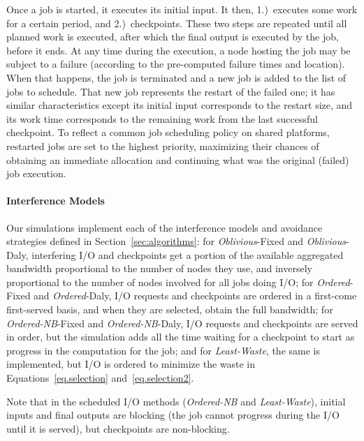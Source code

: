 \documentclass[conference,nofonttune]{IEEEtran}
\newcommand{\nocoop}{\emph{Oblivious}\xspace}
\newcommand{\fifoblock}{\emph{Ordered}\xspace}
\newcommand{\fifononblock}{\emph{Ordered-NB}\xspace}
\newcommand{\leastwaste}{\emph{Least-Waste}\xspace}
\def\propfixed{\nocoop-Fixed\xspace}
\def\propdaly{\nocoop-Daly\xspace}
\def\bfifofixed{\fifoblock-Fixed\xspace}
\def\bfifodaly{\fifoblock-Daly\xspace}
\def\fifofixed{\fifononblock-Fixed\xspace}
\def\fifodaly{\fifononblock-Daly\xspace}
\def\cooperative{\leastwaste}
\begin{document}
Once a job is started, it executes its initial input. It then, 1.)~executes
some work for a certain period, and 2.)~checkpoints. These two steps
are repeated until all planned work is executed, after which the final output
is executed by the job, before it ends.  At any time during the execution, a
node hosting the job may be subject to a failure (according to the pre-computed
failure times and location). When that happens, the job is terminated and a new
job is added to the list of jobs to schedule. That new job represents the
restart of the failed one; it has similar characteristics except its initial
input corresponds to the restart size, and its work time corresponds to the
remaining work from the last successful checkpoint. To reflect a common job
scheduling policy on shared platforms, restarted jobs are set to the highest
priority, maximizing their chances of obtaining an immediate allocation and
continuing what was the original (failed) job execution.


\paragraph*{Interference Models} Our simulations implement each of the
interference models and avoidance strategies defined in
Section~\ref{sec:algorithms}: for \propfixed and \propdaly,
interfering I/O and checkpoints get a portion of the available
aggregated bandwidth proportional to the number of nodes they use, and
inversely proportional to the number of nodes involved for all
jobs doing I/O; for \bfifofixed and \bfifodaly, I/O requests
and checkpoints are ordered in a first-come first-served basis, and
when they are selected, obtain the full bandwidth; for \fifofixed and
\fifodaly, I/O requests and checkpoints are served in order, but the
simulation adds all the time waiting for a checkpoint to start as
progress in the computation for the job; and for \cooperative,
the same is implemented, but I/O is ordered to minimize the waste in
Equations~\eqref{eq.selection} and~\eqref{eq.selection2}.

Note that in the scheduled I/O methods (\fifononblock and \cooperative),
initial inputs and final outputs are blocking (the job cannot progress during
the I/O until it is served), but checkpoints are non-blocking.
\end{document}
